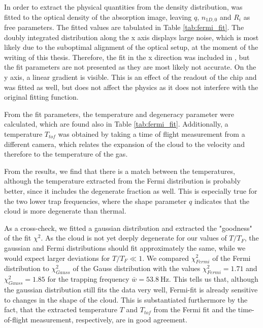 In order to extract the physical quantities from the density distribution,  was fitted to the optical density of the absorption image, leaving $q$, $n_{1D,0}$ and $R_i$ as free parameters. The fitted values are tabulated in Table \ref{tab:fermi_fit}. The doubly integrated distribution along the x axis displays large noise, which is most likely due to the suboptimal alignment of the optical setup, at the moment of the writing of this thesis. Therefore, the fit in the x direction was included in , but the fit parameters are not presented as they are most likely not accurate. On the y axis, a linear gradient is visible. This is an effect of the readout of the chip and was fitted as well, but does not affect the physics as it does not interfere with the original fitting function.

From the fit parameters, the temperature and degeneracy parameter were calculated, which are found also in Table \ref{tab:fermi_fit}. Additionally, a temperature $T_{tof}$ was obtained by taking a time of flight measurement from a different camera, which relates the expansion of the cloud to the velocity and therefore to the temperature of the gas.

From the results, we find that there is a match between the temperatures, although the temperature extracted from the Fermi distribution is probably better, since it includes the degenerate fraction as well. This is especially true for the two lower trap frequencies, where the shape parameter $q$ indicates that the cloud is more degenerate than thermal.

As a cross-check, we fitted a gaussian distribution and extracted the "goodness" of the fit $\chi^2$. As the cloud is not yet deeply degenerate for our values of $T/T_F$, the gaussian and Fermi distributions should fit approximately the same, while we would expect larger deviations for $T/T_F \ll 1$. We compared $\chi_{Fermi}^2$ of the Fermi distribution to $\chi_{Gauss}^2$ of the Gauss distribution with the values $\chi_{Fermi}^2=1.71$ and $\chi_{Gauss}^2=1.85$ for the trapping frequency $\bar{w}=\SI{53.8}{\hertz}$. This tells us that, although the gaussian distribution still fits the data very well, Fermi-fit is already sensitive to changes in the shape of the cloud. This is substantiated furthermore by the fact, that the extracted temperature $T$ and $T_{tof}$ from the Fermi fit and the time-of-flight measurement, respectively, are in good agreement.

